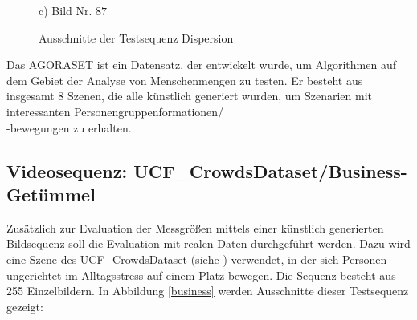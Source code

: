 \begin{figure}[H]
\begin{minipage}{0.3\textwidth}
    c) Bild Nr. $87$
    \label{frame87}
  \end{minipage}
\caption{Ausschnitte der Testsequenz Dispersion \cite{CourtyPRL2014} \cite{Allain2012ICPR}}
\label{crowd_burst}
\end{figure}

Das AGORASET ist ein Datensatz, der entwickelt wurde, um Algorithmen auf dem Gebiet der Analyse von Menschenmengen zu testen. Er besteht aus insgesamt 8 Szenen, die alle künstlich generiert wurden, um Szenarien mit interessanten Personengruppenformationen/\\-bewegungen zu erhalten.

\subsection{Videosequenz: UCF\_CrowdsDataset/Business-Getümmel \cite{AliS07}}
Zusätzlich zur Evaluation der Messgrößen mittels einer künstlich generierten Bildsequenz soll die Evaluation mit realen Daten durchgeführt werden. Dazu wird eine Szene des UCF\_CrowdsDataset (siehe \cite{AliS07}) verwendet, in der sich Personen ungerichtet im Alltagsstress auf einem Platz bewegen. Die Sequenz besteht aus 255 Einzelbildern. In Abbildung \ref{business} werden Ausschnitte dieser Testsequenz gezeigt:

